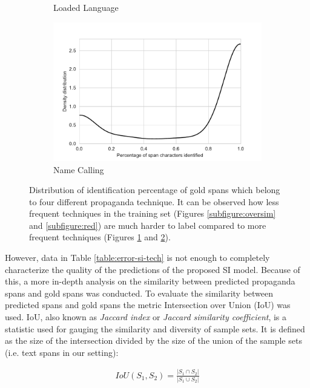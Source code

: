\documentclass[11pt]{article}
\newcommand{\pol}[1]{{\fontfamily{pcr}\selectfont#1}}
\begin{document}
\begin{figure}[h]
\begin{subfigure}{0.23\textwidth}
        \caption{Loaded Language}
        \label{subfigure:loaded}
    \end{subfigure}
    \begin{subfigure}{0.23\textwidth}
        \centering
        \includegraphics[width=\linewidth]{images/Name_Calling.pdf}
        \caption{Name Calling}
         \label{subfigure:calling}
    \end{subfigure}
    \caption{Distribution of identification percentage of gold spans which belong to four different propaganda technique. It can be observed how less frequent techniques in the training set (Figures \ref{subfigure:oversim} and \ref{subfigure:red}) are much harder to label compared to more frequent techniques (Figures \ref{subfigure:loaded} and \ref{subfigure:calling}).}
    \label{fig:tech-dist-si}
\end{figure}

However, data in Table \ref{table:error-si-tech} is not enough to completely characterize the quality of the predictions of the proposed \pol{SI} model. Because of this, a more in-depth analysis on the similarity between predicted propaganda spans and gold spans was conducted. To evaluate the similarity between predicted spans and gold spans the metric Intersection over Union (\pol{IoU}) was used. \pol{IoU}, also known as \textit{Jaccard index} or \textit{Jaccard similarity coefficient}, is a statistic used for gauging the similarity and diversity of sample sets. It is defined as the size of the intersection divided by the size of the union of the sample sets (i.e. text spans in our setting):

\begin{align*}
    IoU(S_1,S_2) = \frac{|S_1 \cap S_2|}{|S_1 \cup S_2|} 
\end{align*}
\end{document}

